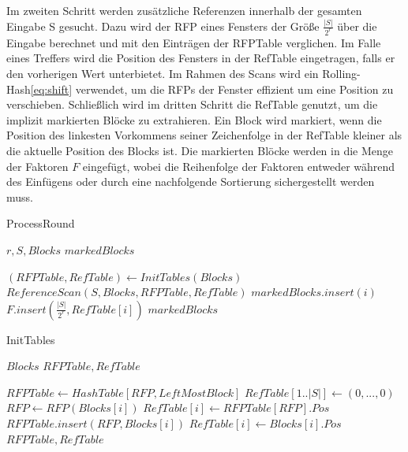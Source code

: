 Im zweiten Schritt werden zusätzliche Referenzen innerhalb der gesamten Eingabe S gesucht. Dazu wird der RFP eines Fensters der Größe $\frac{|S|}{2^r}$ über die Eingabe berechnet und mit den Einträgen der
RFPTable verglichen. Im Falle eines Treffers wird die Position des Fensters in der RefTable eingetragen, falls er den vorherigen Wert unterbietet. Im Rahmen des Scans wird ein Rolling-Hash\ref{eq:shift} 
verwendet, um die RFPs der Fenster effizient um eine Position zu verschieben. 
Schließlich wird im dritten Schritt die RefTable genutzt, um die implizit markierten Blöcke zu extrahieren. Ein Block wird markiert, wenn die Position des linkesten Vorkommens seiner Zeichenfolge in der 
RefTable kleiner als die aktuelle Position des Blocks ist. Die markierten Blöcke werden in die Menge der Faktoren $F$ eingefügt, wobei die Reihenfolge der Faktoren entweder während des Einfügens oder 
durch eine nachfolgende Sortierung sichergestellt werden muss.
\begin{algorithm}[ht]
    \centering
    \caption{ProcessRound} \label{alg:processround}
    \algorithmicrequire $r, S, Blocks$
    \algorithmicensure $markedBlocks$
    \begin{algorithmic}[1]
        \STATE $(RFPTable, RefTable) \gets InitTables(Blocks)$
        \STATE $ReferenceScan(S, Blocks, RFPTable, RefTable)$
                \STATE $markedBlocks.insert(i)$
                \STATE $F.insert(\frac{|S|}{2^r}, RefTable[i])$ 
            \ENDIF
        \ENDFOR
        \RETURN $markedBlocks$
    \end{algorithmic}
    \end{algorithm}

\begin{algorithm}[ht]
\centering
\caption{InitTables} \label{alg:inittables}
\algorithmicrequire $Blocks$
\algorithmicensure $RFPTable, RefTable$
\begin{algorithmic}[1]
    \STATE $RFPTable \gets HashTable[RFP, LeftMostBlock]$
    \STATE $RefTable[1..|S|] \gets (0,...,0)$
        \STATE $RFP \gets RFP(Blocks[i])$
            \STATE $RefTable[i] \gets RFPTable[RFP].Pos$
        \ELSE
            \STATE $RFPTable.insert(RFP,Blocks[i])$
            \STATE $RefTable[i] \gets Blocks[i].Pos$
        \ENDIF
    \ENDFOR
    \RETURN $RFPTable, RefTable$
\end{algorithmic}
\end{algorithm}

